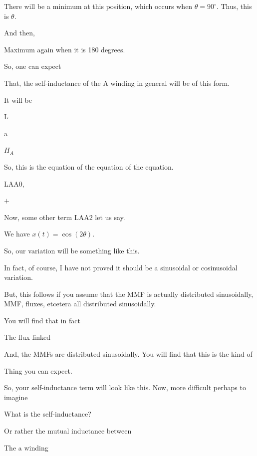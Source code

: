 \documentclass{article}
\begin{document}


There will be a minimum at this position, which occurs when $\theta = 90^\circ$. Thus, this is $\theta$.

And then,



Maximum again when it is 180 degrees.

So, one can expect

That, the self-inductance of the A winding in general will be of this form.

It will be

L

a

$H_A$

So, this is the equation of the equation of the equation.

LAA0,

$+$



Now, some other term LAA2 let us say.

We have $x(t) = \cos(2\theta)$.

So, our variation will be something like this.

In fact, of course, I have not proved it should be a sinusoidal or cosinusoidal variation.

But, this follows if you assume that the MMF is actually distributed sinusoidally, MMF, fluxes, etcetera all distributed sinusoidally.

You will find that in fact

The flux linked

And, the MMFs are distributed sinusoidally. You will find that this is the kind of

Thing you can expect.

So, your self-inductance term will look like this. Now, more difficult perhaps to imagine

What is the self-inductance?

Or rather the mutual inductance between

The a winding
\end{document}
